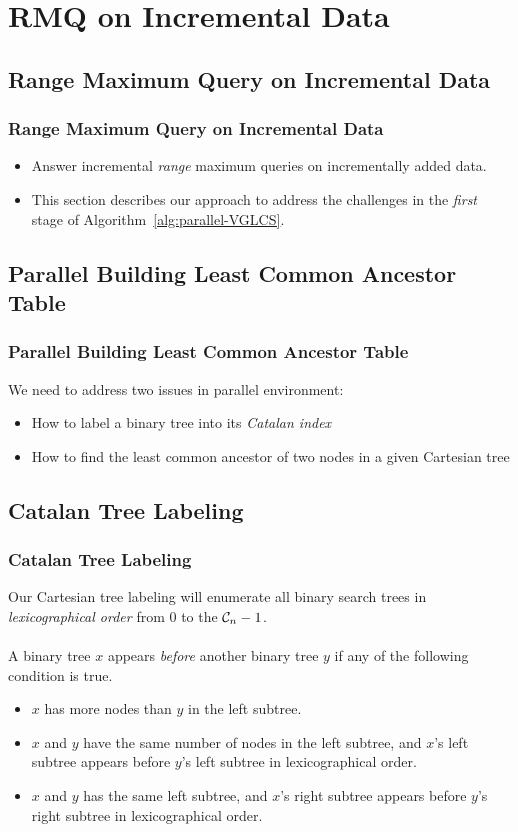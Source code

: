 \section{RMQ on Incremental Data}

\subsection{Range Maximum Query on Incremental Data}
\begin{frame}
    \frametitle{Range Maximum Query on Incremental Data}
    \begin{itemize}
    	\setlength\itemsep{1em}
    	\item
    		Answer incremental {\em range} maximum queries on
			incrementally added data.
    	\item
    		This section describes our approach to address the
			challenges in the {\em first} stage of
			Algorithm~\ref{alg:parallel-VGLCS}.
    \end{itemize}
\end{frame}

\subsection{Parallel Building Least Common Ancestor Table}
\begin{frame}
    \frametitle{Parallel Building Least Common Ancestor Table}
    We need to address two issues in parallel environment:
    \begin{itemize}
    	\setlength\itemsep{1em}
    	\item 
    		How to label a binary tree into its {\em Catalan index}
		\item 
			How to find the least common ancestor of two nodes in a
			given Cartesian tree
	\end{itemize}
\end{frame}

\subsection{Catalan Tree Labeling}
\begin{frame}
    \frametitle{Catalan Tree Labeling}
    Our Cartesian tree labeling will enumerate all binary search trees
	in {\em lexicographical order} from $0$ to the ${\cal C}_n-1$.
	\\~\\
	A binary tree $x$ appears {\em before} another binary tree $y$ if
	any of the following condition is true.
	\begin{itemize}
		\setlength\itemsep{0.5em}
		\item 
			$x$ has more nodes than $y$ in the left subtree.
		\item 
			$x$ and $y$ have the same number of nodes in the left
  			subtree, and $x$'s left subtree appears before $y$'s left
  			subtree in lexicographical order.
		\item 
			$x$ and $y$ has the same left subtree, and $x$'s right
	  		subtree appears before $y$'s right subtree in
	  		lexicographical order.
	\end{itemize}
\end{frame}


